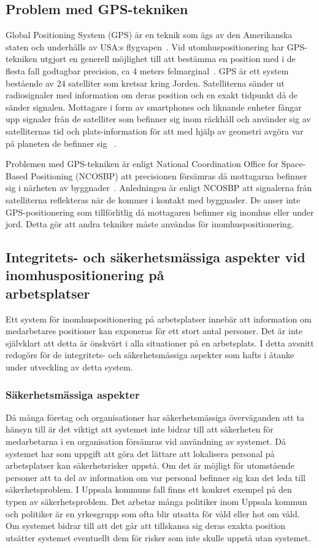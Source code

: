\documentclass[a4paper,12pt]{article}
\begin{document}
 \subsection{Problem med GPS-tekniken}
 Global Positioning System (GPS) är en teknik som ägs av den Amerikanska staten och underhålls av USA:s flygvapen~\cite{GPS_US_HOW}.
 Vid utomhuspositionering har GPS-tekniken utgjort en generell möjlighet till att bestämma en position med i de flesta fall godtagbar precision, ca 4 meters felmarginal~\cite{GPS_US_ACCURACY}.
 GPS är ett system bestående av 24 satelliter som kretsar kring Jorden. Satelliterna sänder ut radiosignaler med information om deras position och en exakt tidpunkt då de sänder signalen. Mottagare i form av smartphones och liknande enheter fångar upp signaler från de satelliter som befinner sig inom räckhåll och använder sig av satelliternas tid och plats-information för att med hjälp av geometri avgöra var på planeten de befinner sig ~\cite{GPS_US_HOW}.

 Problemen med GPS-tekniken är enligt National Coordination Office for Space-Based Positioning (NCOSBP) att precisionen försämras då mottagarna befinner sig i närheten av byggnader~\cite{GPS_US_ACCURACY}. Anledningen är enligt NCOSBP att signalerna från satelliterna reflekteras när de kommer i kontakt med byggnader. De anser inte GPS-positionering som tillförlitlig då mottagaren befinner sig inomhus eller under jord. Detta gör att andra tekniker måste användas för inomhuspositionering.

 \subsection{Integritets- och säkerhetsmässiga aspekter vid inomhuspositionering på \\arbetsplatser}\label{icketekniska_aspekter}
 Ett system för inomhuspositionering på arbetsplatser innebär att information om medarbetares positioner kan exponeras för ett stort antal personer. Det är inte självklart att detta är önskvärt i alla situationer på en arbetsplats. I detta avsnitt redogörs för de integritets- och säkerhetsmässiga aspekter som hafts i åtanke under utveckling av detta system.

 \subsubsection{Säkerhetsmässiga aspekter}
 Då många företag och organisationer har säkerhetsmässiga överväganden att ta hänsyn till är det viktigt att systemet inte bidrar till att säkerheten för medarbetarna i en organisation försämras vid användning av systemet.
 Då systemet har som uppgift att göra det lättare att lokalisera personal på arbetsplatser kan säkerhetsrisker uppstå. Om det är möjligt för utomstående personer att ta del av information om var personal befinner sig kan det leda till säkerhetsproblem. I Uppsala kommuns fall finns ett konkret exempel på den typen av säkerhetsproblem. Det arbetar många politiker inom Uppsala kommun och politiker är en yrkesgrupp som ofta blir utsatta för våld eller hot om våld. Om systemet bidrar till att det går att tillskansa sig deras exakta position utsätter systemet eventuellt dem för risker som inte skulle uppstå utan systemet.
\end{document}
